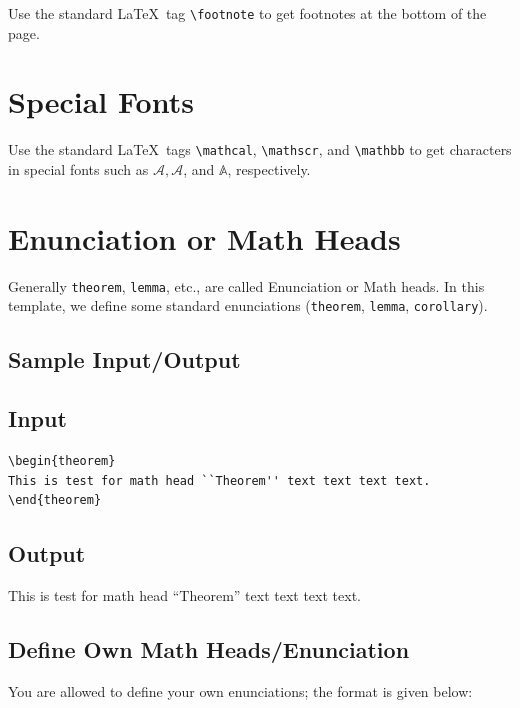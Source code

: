 \documentclass[]{imag-ms-template}
\begin{document}
Use the standard \LaTeX\ tag \verb!\footnote! to get footnotes at the
bottom of the page.

\section{Special Fonts}

Use the standard \LaTeX\ tags \verb!\mathcal!, \verb!\mathscr!, and
\verb!\mathbb! to get characters in special fonts such as
$\mathcal{A}, \mathscr{A}$, and $\mathbb{A}$, respectively.

\section{Enunciation or Math Heads}

Generally \verb!theorem!, \verb!lemma!, etc., are called
Enunciation or Math heads. In this template, we define some standard
enunciations (\verb!theorem!, \verb!lemma!, \verb!corollary!).

\subsection*{Sample Input/Output}

\subsection{Input}

\begin{verbatim}
\begin{theorem}
This is test for math head ``Theorem'' text text text text.
\end{theorem}
\end{verbatim}

\subsection{Output}

\begin{theorem}
This is test for math head ``Theorem'' text text text text.
\end{theorem}

\subsection{Define Own Math Heads/Enunciation}

You are allowed to define your own enunciations; the format is given
below:
\end{document}
